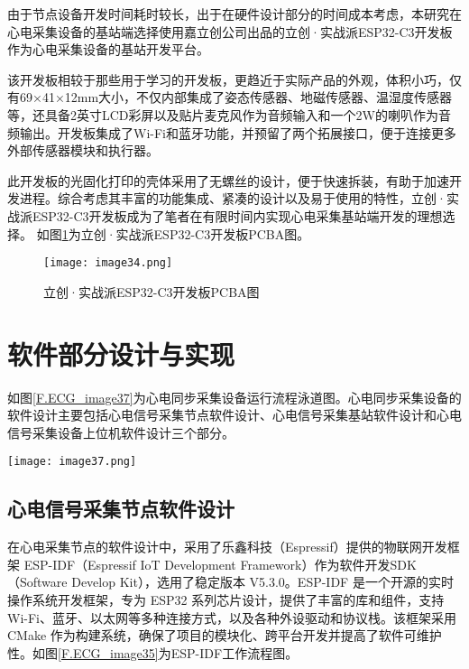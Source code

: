 由于节点设备开发时间耗时较长，出于在硬件设计部分的时间成本考虑，本研究在心电采集设备的基站端选择使用嘉立创公司出品的立创·实战派ESP32-C3开发板作为心电采集设备的基站开发平台。

该开发板相较于那些用于学习的开发板，更趋近于实际产品的外观，体积小巧，仅有69×41×12mm大小，不仅内部集成了姿态传感器、地磁传感器、温湿度传感器等，还具备2英寸LCD彩屏以及贴片麦克风作为音频输入和一个2W的喇叭作为音频输出。开发板集成了Wi-Fi和蓝牙功能，并预留了两个拓展接口，便于连接更多外部传感器模块和执行器。

此开发板的光固化打印的壳体采用了无螺丝的设计，便于快速拆装，有助于加速开发进程。综合考虑其丰富的功能集成、紧凑的设计以及易于使用的特性，立创·实战派ESP32-C3开发板成为了笔者在有限时间内实现心电采集基站端开发的理想选择。 如图\ref{F.ECG_image34}为立创·实战派ESP32-C3开发板PCBA图。

\begin{figure}[htb]
    \centering
    \texttt{[image: image34.png]}
    \caption{立创·实战派ESP32-C3开发板PCBA图}
    \label{F.ECG_image34}
\end{figure}

\section{软件部分设计与实现}

如图\ref{F.ECG_image37}为心电同步采集设备运行流程泳道图。心电同步采集设备的软件设计主要包括心电信号采集节点软件设计、心电信号采集基站软件设计和心电信号采集设备上位机软件设计三个部分。

\begin{sidewaysfigure}
    \centering
    \texttt{[image: image37.png]}
    \caption{心电同步采集设备运行流程泳道图}
    \label{F.ECG_image37}
\end{sidewaysfigure}

\subsection{心电信号采集节点软件设计}

在心电采集节点的软件设计中，采用了乐鑫科技（Espressif）提供的物联网开发框架 ESP-IDF（Espressif IoT Development Framework）作为软件开发SDK（Software Develop Kit），选用了稳定版本 V5.3.0。ESP-IDF 是一个开源的实时操作系统开发框架，专为 ESP32 系列芯片设计，提供了丰富的库和组件，支持 Wi-Fi、蓝牙、以太网等多种连接方式，以及各种外设驱动和协议栈。该框架采用 CMake 作为构建系统，确保了项目的模块化、跨平台开发并提高了软件可维护性。如图\ref{F.ECG_image35}为ESP-IDF工作流程图。

